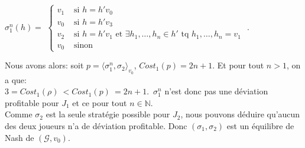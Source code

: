 \begin{exemple}
$\sigma _{1}^{n}(h) = $ $\begin{cases}
					 v_{1} & \text{ si } h = h'v_{0}\\
					 v_{0} & \text{ si } h = h'v_{3}\\
					 v_{2} & \text{ si } h = h'v_{1} \text{ et } \exists h_{1},\ldots,h_{n} \in h' \text{ tq } h_{1},\ldots,h_{n} = v_{1} \\
					v_{0} & \text{ sinon}
					
					\end{cases}$ .
					
\noindent Nous avons alors: soit $ p = \langle \sigma _{1}^{n},\sigma _{2} \rangle_{v_0}$, $Cost_{1}(p) = 2n+1$. Et pour tout $n > 1$, on a que: \\\mbox{$3=Cost_{1}(\rho)~< Cost_{1}(p)~= 2n +1$. $\sigma _{1}^{n}$} n'est donc pas une déviation profitable pour $J_{1}$ et ce pour tout $n \in  \mathbb{N}$.\\

Comme $\sigma _{2}$ est la seule stratégie possible pour $J_{2}$, nous pouvons déduire qu'aucun des deux joueurs n'a de déviation profitable. Donc $(\sigma _{1}, \sigma _{2})$ est un équilibre de Nash de $(\mathcal{G},v_{0})$.

\end{exemple}


